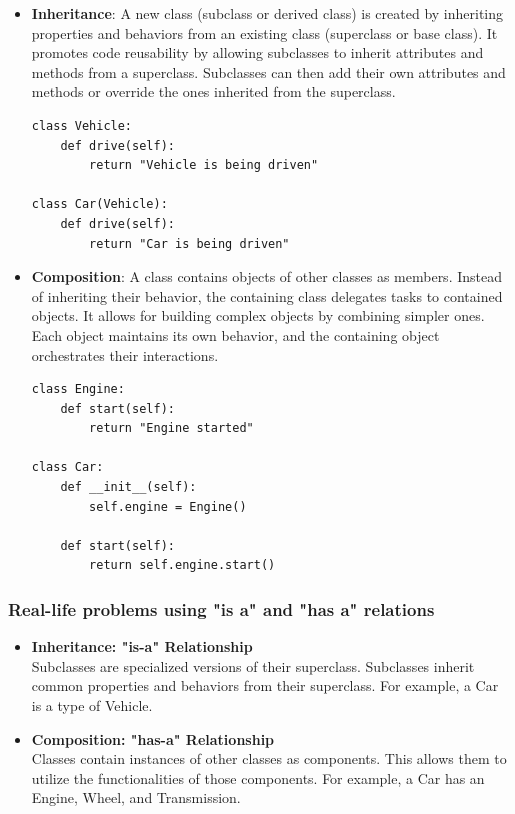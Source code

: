 \begin{itemize}
\item \textbf{Inheritance}: A new class (subclass or derived class) is created by inheriting properties and behaviors from an existing class (superclass or base class). It promotes code reusability by allowing subclasses to inherit attributes and methods from a superclass. Subclasses can then add their own attributes and methods or override the ones inherited from the superclass.

\begin{codebox}
\begin{verbatim}
class Vehicle:
    def drive(self):
        return "Vehicle is being driven"

class Car(Vehicle):
    def drive(self):
        return "Car is being driven"
\end{verbatim}
\end{codebox}


\item \textbf{Composition}: A class contains objects of other classes as members. Instead of inheriting their behavior, the containing class delegates tasks to contained objects. It allows for building complex objects by combining simpler ones. Each object maintains its own behavior, and the containing object orchestrates their interactions.

\begin{codebox}
\begin{verbatim}
class Engine:
    def start(self):
        return "Engine started"

class Car:
    def __init__(self):
        self.engine = Engine()
        
    def start(self):
        return self.engine.start()
\end{verbatim}
\end{codebox}
\end{itemize}

\subsubsection{Real-life problems using "is a" and "has a" relations}

\begin{itemize}
\item \textbf{Inheritance: "is-a" Relationship}\\
Subclasses are specialized versions of their superclass. Subclasses inherit common properties and behaviors from their superclass. For example, a Car is a type of Vehicle.\\

\item \textbf{Composition: "has-a" Relationship}\\
Classes contain instances of other classes as components. This allows them to utilize the functionalities of those components. For example, a Car has an Engine, Wheel, and Transmission.
\end{itemize}

